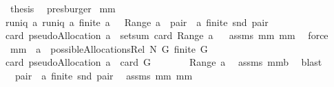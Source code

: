 \begin{isabellebody}
\ {\isacharquery}thesis\ \isamarkupfalse%
\ presburger\isanewline
{}\isamarkupfalse%
%
\endisatagproof
{\isafoldproof}%
%
\isadelimproof
\isanewline
%
\endisadelimproof
\isanewline
{}\isamarkupfalse%
\ mm{}{}{\isacharcolon}\ \ \isanewline
{\isachardoublequoteopen}runiq\ {\isacharparenleft}a{\isacharcircum}{\isacharminus}{}{\isacharparenright}{\isachardoublequoteclose}\ {\isachardoublequoteopen}runiq\ a{\isachardoublequoteclose}\ {\isachardoublequoteopen}finite\ a{\isachardoublequoteclose}\ {\isachardoublequoteopen}{\isacharbraceleft}{\isacharbraceright}\ {\isasymnotin}\ Range\ a{\isachardoublequoteclose}\ {\isachardoublequoteopen}{\isasymforall}\ pair\ {\isasymin}\ a{\isachardot}\ finite\ {\isacharparenleft}snd\ pair{\isacharparenright}{\isachardoublequoteclose}\ \ \isanewline
{\isachardoublequoteopen}card\ {\isacharparenleft}pseudoAllocation\ a{\isacharparenright}\ {\isacharequal}\ setsum\ card\ {\isacharparenleft}Range\ a{\isacharparenright}{\isachardoublequoteclose}%
\isadelimproof
\ %
\endisadelimproof
%
\isatagproof
{}\isamarkupfalse%
\ assms\ mm{}{}\ mm{}{}\ \isamarkupfalse%
\ force%
\endisatagproof
{\isafoldproof}%
%
\isadelimproof
%
\endisadelimproof
\isanewline
\isanewline
{}\isamarkupfalse%
\ mm{}{}{\isacharcolon}\ \ {\isachardoublequoteopen}a\ {\isasymin}\ possibleAllocationsRel\ N\ G{\isachardoublequoteclose}\ {\isachardoublequoteopen}finite\ G{\isachardoublequoteclose}\ \ \isanewline
{\isachardoublequoteopen}card\ {\isacharparenleft}pseudoAllocation\ a{\isacharparenright}\ {\isacharequal}\ card\ G{\isachardoublequoteclose}\isanewline
%
\isadelimproof
%
\endisadelimproof
%
\isatagproof
{}\isamarkupfalse%
\ {\isacharminus}\isanewline
\ \ \isamarkupfalse%
\ {\isachardoublequoteopen}{\isacharbraceleft}{\isacharbraceright}\ {\isasymnotin}\ Range\ a{\isachardoublequoteclose}\ \isamarkupfalse%
\ assms\ mm{}{}b\ \isamarkupfalse%
\ blast\isanewline
\ \ \isamarkupfalse%
\ \isamarkupfalse%
\ {\isachardoublequoteopen}{\isasymforall}\ pair\ {\isasymin}\ a{\isachardot}\ finite\ {\isacharparenleft}snd\ pair{\isacharparenright}{\isachardoublequoteclose}\ \isamarkupfalse%
\ assms\ mm{}{}\ mm{}{}\ \isamarkupfalse%

\end{isabellebody}
